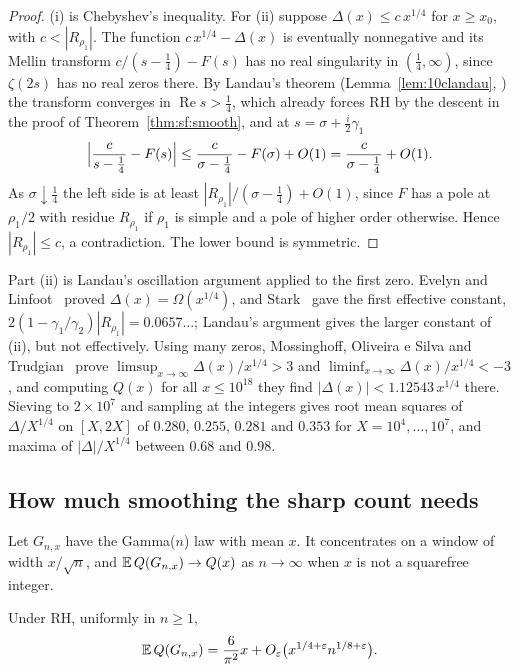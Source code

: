\begin{proof}
(i) is Chebyshev's inequality. For (ii) suppose $\Delta(x)\le c\,x^{1/4}$ for $x\ge x_0$, with $c<|R_{\rho_1}|$. The function $c\,x^{1/4}-\Delta(x)$ is eventually nonnegative and its Mellin transform $c/(s-\frac14)-F(s)$ has no real singularity in $(\frac14,\infty)$, since $\zeta(2s)$ has no real zeros there. By Landau's theorem (Lemma~\ref{lem:10clandau}, \cite{landau1905}) the transform converges in $\operatorname{Re} s>\frac14$, which already forces RH by the descent in the proof of Theorem~\ref{thm:sf:smooth}, and at $s=\sigma+\frac i2\gamma_1$
\[
\Bigl|\frac{c}{s-\frac14}-F(s)\Bigr|\le\frac{c}{\sigma-\frac14}-F(\sigma)+O(1)=\frac{c}{\sigma-\frac14}+O(1).
\]
As $\sigma\downarrow\frac14$ the left side is at least $|R_{\rho_1}|/(\sigma-\frac14)+O(1)$, since $F$ has a pole at $\rho_1/2$ with residue $R_{\rho_1}$ if $\rho_1$ is simple and a pole of higher order otherwise. Hence $|R_{\rho_1}|\le c$, a contradiction. The lower bound is symmetric.
\end{proof}

Part (ii) is Landau's oscillation argument applied to the first zero. Evelyn and Linfoot~\cite{evelynlinfoot1931} proved $\Delta(x)=\Omega(x^{1/4})$, and Stark~\cite{stark1966} gave the first effective constant, $2(1-\gamma_1/\gamma_2)|R_{\rho_1}|=0.0657\ldots$; Landau's argument gives the larger constant of (ii), but not effectively. Using many zeros, Mossinghoff, Oliveira e Silva and Trudgian~\cite{mot2021} prove $\limsup_{x\to\infty}\Delta(x)/x^{1/4}>3$ and $\liminf_{x\to\infty}\Delta(x)/x^{1/4}<-3$, and computing $Q(x)$ for all $x\le10^{18}$ they find $|\Delta(x)|<1.12543\,x^{1/4}$ there. Sieving to $2\times10^7$ and sampling at the integers gives root mean squares of $\Delta/X^{1/4}$ on $[X,2X]$ of $0.280$, $0.255$, $0.281$ and $0.353$ for $X=10^4,\ldots,10^7$, and maxima of $|\Delta|/X^{1/4}$ between $0.68$ and $0.98$.

\subsection{How much smoothing the sharp count needs}
Let $G_{n,x}$ have the Gamma($n$) law with mean $x$. It concentrates on a window of width $x/\sqrt n$, and $\mathbb{E}\,Q(G_{n,x})\to Q(x)$ as $n\to\infty$ when $x$ is not a squarefree integer.

\begin{proposition}\label{prop:sf:gamman}
Under RH, uniformly in $n\ge1$,
\[
\mathbb{E}\,Q(G_{n,x})=\frac{6}{\pi^2}x+O_\varepsilon\bigl(x^{1/4+\varepsilon}n^{1/8+\varepsilon}\bigr).
\]
\end{proposition}

